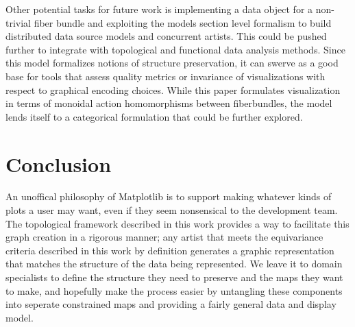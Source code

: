 \documentclass[../main.tex]{subfiles}
\begin{document}
 Other potential tasks for future work is implementing a data object for a non-trivial fiber bundle and exploiting the models section level formalism to build distributed data source models and concurrent artists. This could be pushed further to integrate with topological\cite{heineSurveyTopologybasedMethods2016} and functional \cite{ramsayFunctionalDataAnalysis2006a} data analysis methods. Since this model formalizes notions of structure preservation, it can swerve as a good base for tools that assess quality metrics\cite{bertiniQualityMetricsHighdimensional2011a} or invariance \cite{kindlmann2014algebraic} of visualizations with respect to graphical encoding choices. While this paper formulates visualization in terms of monoidal action homomorphisms between fiberbundles, the model lends itself to a categorical formulation\cite{fongInvitationAppliedCategory2019,milewskiCategoryTheoryProgrammers} that could be further explored. 
  


\section{Conclusion}
An unoffical philosophy of Matplotlib is to support making whatever kinds of plots a user may want, even if they seem nonsensical to the development team. The topological framework described in this work provides a way to facilitate this graph creation in a rigorous manner; any artist that meets the equivariance criteria described in this work by definition generates a graphic representation that matches the structure of the data being represented. We leave it to domain specialists to define the structure they need to preserve and the maps they want to make, and hopefully make the process easier by untangling these components into seperate constrained maps and providing a fairly general data and display model. 
\end{document}
